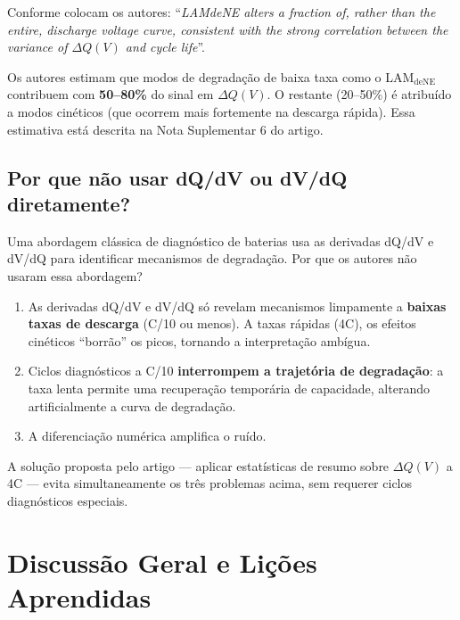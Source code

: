 \documentclass[12pt,a4paper]{article}
\begin{document}
Conforme colocam os autores: ``\textit{LAMdeNE alters a fraction of, rather
than the entire, discharge voltage curve, consistent with the strong correlation
between the variance of $\Delta Q(V)$ and cycle life}''.

\begin{destaque}
Os autores estimam que modos de degrada\c{c}\~ao de baixa taxa como o LAM$_\text{deNE}$
contribuem com \textbf{50--80\%} do sinal em $\Delta Q(V)$. O restante (20--50\%)
\'{e} atribu\'{i}do a modos cin\'{e}ticos (que ocorrem mais fortemente na descarga r\'{a}pida).
Essa estimativa est\'{a} descrita na Nota Suplementar 6 do artigo.
\end{destaque}

\subsection{Por que n\~ao usar dQ/dV ou dV/dQ diretamente?}

Uma abordagem cl\'{a}ssica de diagn\'{o}stico de baterias usa as derivadas dQ/dV
e dV/dQ para identificar mecanismos de degrada\c{c}\~ao. Por que os autores n\~ao
usaram essa abordagem?

\begin{enumerate}
  \item As derivadas dQ/dV e dV/dQ s\'{o} revelam mecanismos limpamente a
    \textbf{baixas taxas de descarga} (C/10 ou menos). A taxas r\'{a}pidas (4C),
    os efeitos cin\'{e}ticos ``borr\~ao'' os picos, tornando a interpreta\c{c}\~ao
    amb\'{i}gua.
  \item Ciclos diagn\'{o}sticos a C/10 \textbf{interrompem a trajet\'{o}ria de
    degrada\c{c}\~ao}: a taxa lenta permite uma recupera\c{c}\~ao tempor\'{a}ria de
    capacidade, alterando artificialmente a curva de degrada\c{c}\~ao.
  \item A diferencia\c{c}\~ao num\'{e}rica amplifica o ru\'{i}do.
\end{enumerate}

A solu\c{c}\~ao proposta pelo artigo --- aplicar estat\'{i}sticas de resumo sobre
$\Delta Q(V)$ a 4C --- evita simultaneamente os tr\^{e}s problemas acima,
sem requerer ciclos diagn\'{o}sticos especiais.

\section{Discuss\~ao Geral e Li\c{c}\~oes Aprendidas}
\end{document}

